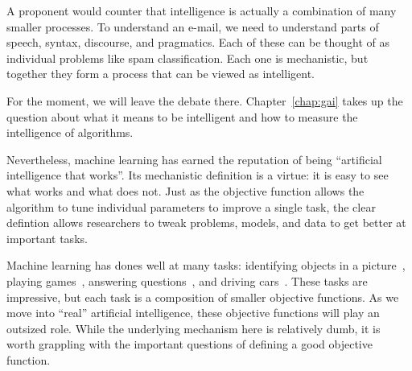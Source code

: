 
A proponent would counter that intelligence is actually a combination
of many smaller processes.  To understand an e-mail, we need to
understand parts of speech, syntax, discourse, and pragmatics.  Each
of these can be thought of as individual problems like spam
classification.  Each one is mechanistic, but together they form a
process that can be viewed as intelligent.

For the moment, we will leave the debate there.
Chapter~\ref{chap:gai} takes up the question about what it means to be
intelligent and how to measure the intelligence of algorithms.


Nevertheless, machine learning has earned the reputation of being
``artificial intelligence that works''.  Its mechanistic definition is
a virtue: it is easy to see what works and what does not.  Just as the
objective function allows the algorithm to tune individual parameters
to improve a single task, the clear defintion allows researchers to
tweak problems, models, and data to get better at important tasks.


Machine learning has dones well at many tasks: identifying objects in
a picture~\citep{russakovsky-15}, playing
games~\citep{vinyals2017starcraft}, answering
questions~\citep{ferruci-10}, and driving cars~\citep{thrun-10}.
%
These tasks are impressive, but each task is a composition of smaller objective
functions.
%
As we move into ``real'' artificial intelligence, these objective
functions will play an outsized role.
%
While the underlying mechanism here is relatively dumb, it is worth
grappling with the important questions of defining a good objective
function.

\subsection{}

